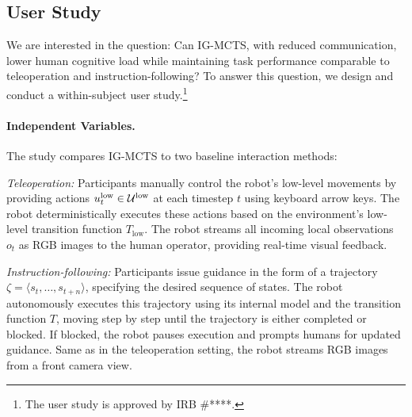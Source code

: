 \subsection{User Study}
We are interested in the question: Can IG-MCTS, with reduced communication, lower human cognitive load while maintaining task performance comparable to teleoperation and instruction-following?
To answer this question, we design and conduct a within-subject user study.\footnote{The user study is approved by IRB \#****.}

\paragraph{Independent Variables.}  
The study compares IG-MCTS to two baseline interaction methods:

\emph{Teleoperation:} Participants manually control the robot’s low-level movements by providing actions \(u_t^\mathrm{low} \in \mathcal{U}^\mathrm{low}\) at each timestep \(t\) using keyboard arrow keys. The robot deterministically executes these actions based on the environment’s low-level transition function $T_\mathrm{low}$. The robot streams all incoming local observations \(o_t\) as RGB images to the human operator, providing real-time visual feedback. 

\emph{Instruction-following:} Participants issue guidance in the form of a trajectory $\zeta = \langle s_t, \dots, s_{t+n} \rangle$, specifying the desired sequence of states. The robot autonomously executes this trajectory using its internal model and the transition function \(T\), moving step by step until the trajectory is either completed or blocked. If blocked, the robot pauses execution and prompts humans for updated guidance. Same as in the teleoperation setting, the robot streams RGB images from a front camera view.

